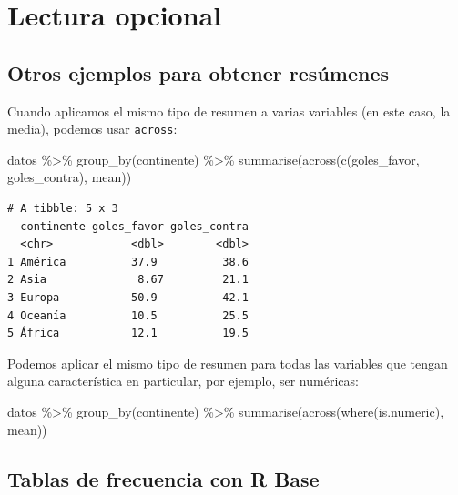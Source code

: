 \documentclass[
]{book}
\newenvironment{Shaded}{\begin{snugshade}}{\end{snugshade}}
\newcommand{\FunctionTok}[1]{\textcolor[rgb]{0.00,0.00,0.00}{#1}}
\newcommand{\NormalTok}[1]{#1}
\newcommand{\SpecialCharTok}[1]{\textcolor[rgb]{0.00,0.00,0.00}{#1}}
\begin{document}
\hypertarget{lectura-opcional}{%
\section{Lectura opcional}\label{lectura-opcional}}

\hypertarget{otros-ejemplos-para-obtener-resuxfamenes}{%
\subsection{Otros ejemplos para obtener resúmenes}\label{otros-ejemplos-para-obtener-resuxfamenes}}

Cuando aplicamos el mismo tipo de resumen a varias variables (en este caso, la media), podemos usar \texttt{across}:

\begin{Shaded}
\begin{Highlighting}[]
\NormalTok{datos }\SpecialCharTok{\%\textgreater{}\%} 
    \FunctionTok{group\_by}\NormalTok{(continente) }\SpecialCharTok{\%\textgreater{}\%} 
    \FunctionTok{summarise}\NormalTok{(}\FunctionTok{across}\NormalTok{(}\FunctionTok{c}\NormalTok{(goles\_favor, goles\_contra), mean))}
\end{Highlighting}
\end{Shaded}

\begin{verbatim}
# A tibble: 5 x 3
  continente goles_favor goles_contra
  <chr>            <dbl>        <dbl>
1 América          37.9          38.6
2 Asia              8.67         21.1
3 Europa           50.9          42.1
4 Oceanía          10.5          25.5
5 África           12.1          19.5
\end{verbatim}

Podemos aplicar el mismo tipo de resumen para todas las variables que tengan alguna característica en particular, por ejemplo, ser numéricas:

\begin{Shaded}
\begin{Highlighting}[]
\NormalTok{datos }\SpecialCharTok{\%\textgreater{}\%} 
    \FunctionTok{group\_by}\NormalTok{(continente) }\SpecialCharTok{\%\textgreater{}\%} 
    \FunctionTok{summarise}\NormalTok{(}\FunctionTok{across}\NormalTok{(}\FunctionTok{where}\NormalTok{(is.numeric), mean))}
\end{Highlighting}
\end{Shaded}

\hypertarget{tablas-de-frecuencia-con-r-base}{%
\subsection{Tablas de frecuencia con R Base}\label{tablas-de-frecuencia-con-r-base}}
\end{document}

